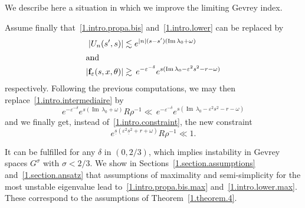 \documentclass[10pt]{amsart}
\theoremstyle{definition}
\theoremstyle{plain}
\newcommand*\e{\varepsilon}
\newcommand*\f{{\mathbf f}}
\newcommand*\und{\underline}
\DeclareMathOperator{\Imm}{Im}
\begin{document}
We describe here a situation in which we improve the limiting Gevrey index.

Assume finally that~\eqref{1.intro.propa.bis} and~\eqref{1.intro.lower} can be replaced by
\begin{align}\left|U_n(s',s)\right| &\lesssim e^{|n|(s-s') ({\Imm}\,\lambda_0 + \omega)}\label{1.intro.propa.bis.max}
\\
\intertext{and}
|\f_{\e}(s,x,\theta)| &\gtrsim \,e^{-\e^{-\delta}} e^{s({\Imm}\,\lambda_0 - \e^2 s^2- r - \omega)}\label{1.intro.lower.max}
\end{align}
respectively. Following the previous computations, we may then replace~\eqref{1.intro.intermediaire} by
\[
e^{-\e^{-\delta}} e^{s ({\Imm}\,\lambda_0 + \omega)} R\rho^{-1} \ll \,e^{-\e^{-\delta}} e^{s({\Imm}\,\lambda_0 - \e^2 s^2 - r - \omega)}
\]
and we finally get, instead of~\eqref{1.intro.constraint}, the new constraint
\[
e^{\und{s}(\e^2 \und{s}^2 + r + \omega)} R\rho^{-1} \ll 1.
\]


It can be fulfilled for any $\delta$ in $(0,2/3)$, which implies instability in Gevrey spaces $G^{\sigma}$ with $\sigma < 2/3$. We show in Sections~\ref{1.section.assumptions} and~\ref{1.section.ansatz} that assumptions of maximality and semi-simplicity for the most unstable eigenvalue lead to~\eqref{1.intro.propa.bis.max} and~\eqref{1.intro.lower.max}. These correspond to the assumptions of Theorem~\ref{1.theorem.4}.
\end{document}
